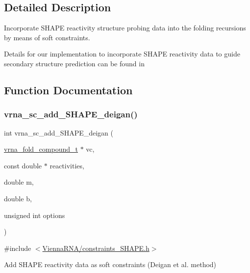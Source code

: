 \subsection{Detailed Description}
Incorporate S\+H\+A\+PE reactivity structure probing data into the folding recursions by means of soft constraints. 

Details for our implementation to incorporate S\+H\+A\+PE reactivity data to guide secondary structure prediction can be found in \cite{lorenz:2016a} 

\subsection{Function Documentation}
\mbox{\label{group__SHAPE__reactivities_ga57d612b58e1c61dd6cfcb5a843f8f1b3}} 
\subsubsection{\texorpdfstring{vrna\+\_\+sc\+\_\+add\+\_\+\+S\+H\+A\+P\+E\+\_\+deigan()}{vrna\_sc\_add\_SHAPE\_deigan()}}
{\footnotesize\ttfamily int vrna\+\_\+sc\+\_\+add\+\_\+\+S\+H\+A\+P\+E\+\_\+deigan (\begin{DoxyParamCaption}\item[{\hyperlink{group__fold__compound_ga1b0cef17fd40466cef5968eaeeff6166}{vrna\+\_\+fold\+\_\+compound\+\_\+t} $\ast$}]{vc,  }\item[{const double $\ast$}]{reactivities,  }\item[{double}]{m,  }\item[{double}]{b,  }\item[{unsigned int}]{options }\end{DoxyParamCaption})}



{\ttfamily \#include $<$\hyperlink{constraints__SHAPE_8h}{Vienna\+R\+N\+A/constraints\+\_\+\+S\+H\+A\+P\+E.\+h}$>$}



Add S\+H\+A\+PE reactivity data as soft constraints (Deigan et al. method) 

